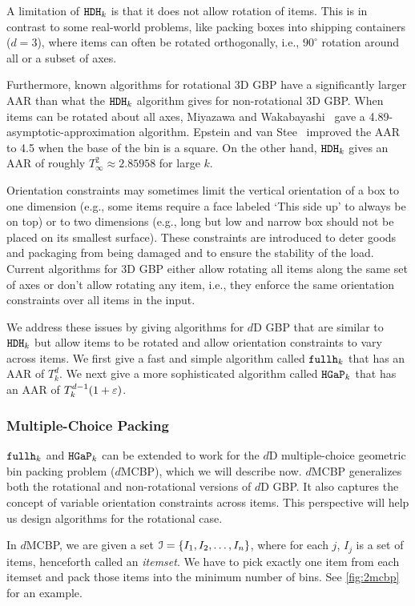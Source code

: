 A limitation of $\operatorname{\mathtt{HDH}}_{k}$ is that it does not allow rotation of items.
This is in contrast to some real-world problems,
like packing boxes into shipping containers ($d=3$),
where items can often be rotated orthogonally,
i.e., $90^{\circ}$ rotation around all or a subset of axes.

Furthermore, known algorithms for rotational 3D GBP have a significantly larger AAR
than what the $\operatorname{\mathtt{HDH}}_{k}$ algorithm gives for non-rotational 3D GBP.
When items can be rotated about all axes,
Miyazawa and Wakabayashi~\cite{miyazawa2009three} gave a
4.89-asymptotic-approximation algorithm.
Epstein and van Stee~\cite{epstein2006side} improved the AAR to
4.5 when the base of the bin is a square.
On the other hand, $\operatorname{\mathtt{HDH}}_{k}$ gives an AAR of roughly
$T_{\infty}^2 \approx 2.85958$ for large $k$.

Orientation constraints may sometimes limit the vertical orientation of a box to one dimension
(e.g., some items require a face labeled `This side up' to always be on top)
or to two dimensions
(e.g., long but low and narrow box should not be placed on its smallest surface).
These constraints are introduced to deter goods
and packaging from being damaged and to ensure the stability of the load.
Current algorithms for 3D GBP either allow rotating all items along the same set of axes
or don't allow rotating any item, i.e., they enforce the same
orientation constraints over all items in the input.

We address these issues by giving algorithms for $d$D GBP
that are similar to $\operatorname{\mathtt{HDH}}_{k}$ but allow items to be rotated
and allow orientation constraints to vary across items.
We first give a fast and simple algorithm called $\operatorname{\mathtt{fullh}}_{k}$ that has an AAR of $T_k^d$.
We next give a more sophisticated algorithm called $\operatorname{\mathtt{HGaP}}_{k}$
that has an AAR of $T_k^{d-1}(1+\varepsilon)$.

\subsubsection{Multiple-Choice Packing}

$\operatorname{\mathtt{fullh}}_{k}$ and $\operatorname{\mathtt{HGaP}}_{k}$ can be extended to work for the $d$D multiple-choice
geometric bin packing problem ($d$MCBP), which we will describe now.
$d$MCBP generalizes both the rotational and non-rotational versions of $d$D GBP.
It also captures the concept of variable orientation constraints across items.
This perspective will help us design algorithms for the rotational case.

In $d$MCBP, we are given a set $\mathcal{I} = \{I_1, I_2, \ldots, I_n\}$,
where for each $j$, $I_j$ is a set of items, henceforth called an {\em itemset}.
We have to pick exactly one item from each itemset and pack those items
into the minimum number of bins. See \cref{fig:2mcbp} for an example.

